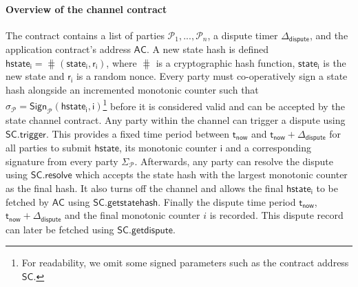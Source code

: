 \documentclass{article}
\newcommand{\cmd}{\mathsf{cmd}}
\newcommand{\hstate}{\mathsf{hstate}}
\newcommand{\hstatei}{\mathsf{hstate}_{\monotoniccounter}}
\newcommand{\hstateplus}{\ensuremath{\mathsf{hstate}_{\monotoniccounter+1}}}
\newcommand{\monotoniccounter}{\mathsf{i}}
\newcommand{\stateinfoi}{\mathsf{state}_{\mathsf{i}}}
\newcommand{\stateinfoplus}{\mathsf{state}_{\mathsf{i+1}}}
\newcommand{\participant}{\mathcal{P}}
\newcommand{\rani}{\mathsf{r}_{\mathsf{i}}}
\newcommand{\statechannel}{\mathsf{SC}}
\newcommand{\statechanneldispute}{\mathsf{SC}.\mathsf{trigger}}
\newcommand{\statechannelresolve}{\mathsf{SC}.\mathsf{resolve}}
\newcommand{\statechannelgetcommitment}{\mathsf{SC}.\mathsf{getstatehash}}
\newcommand{\statechannelgetdispute}{\mathsf{SC}.\mathsf{getdispute}}
\newcommand{\sign}{\mathsf{Sign}}
\newcommand{\appcontract}{\mathsf{AC}}
\newcommand{\timerdispute}{\mathsf{\Delta}_{\mathsf{dispute}}}
\newcommand{\timenow}{\mathsf{t}_{\mathsf{now}}}
\newcommand{\timedispute}{\timenow + \mathsf{\Delta}_{\mathsf{dispute}}}
\begin{document}
\paragraph{Overview of the channel contract} 
The contract contains a list of parties $\participant_{1},...,\participant_{n}$, a dispute timer $\timerdispute$, and the application contract's address $\appcontract$. 
A new state hash is defined $\hstatei = \hash(\stateinfoi, \rani)$, where $\hash$ is a cryptographic hash function, $\stateinfoi$ is the new state and $\rani$ is a random nonce.
Every party must co-operatively sign a state hash alongside an incremented monotonic counter such that $\sigma_{\participant} = \sign_{\participant}(\hstatei, \monotoniccounter)$\footnote{For readability, we omit some signed parameters such as the contract address $\statechannel$.} before it is considered valid and can be accepted by the state channel contract. 
Any party within the channel can trigger a dispute using $\statechanneldispute$.
This provides a fixed time period between $\timenow$ and $\timedispute$ for all parties to submit $\hstate$, its monotonic counter $\monotoniccounter$ and a corresponding signature from every party $\Sigma_{\participant}$. 
Afterwards, any party can resolve the dispute using $\statechannelresolve$ which accepts the state hash with the largest monotonic counter as the final hash.
It also turns off the channel and allows the final $\hstatei$ to be fetched by $\appcontract$ using  $\statechannelgetcommitment$. 
Finally the dispute time period $\timenow$, $\timedispute$ and the final monotonic counter $i$ is recorded.
This dispute record can later be fetched using $\statechannelgetdispute$. 
%
%
\end{document}
